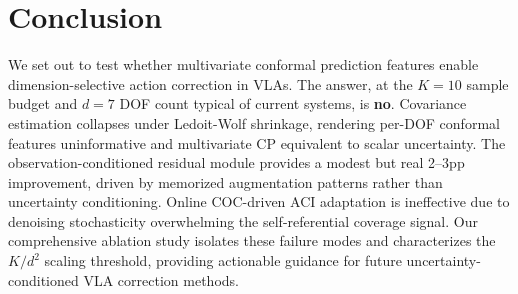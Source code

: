 \documentclass[letterpaper]{article}
\begin{document}
\section{Conclusion}

We set out to test whether multivariate conformal prediction features enable dimension-selective action correction in VLAs.
The answer, at the $K{=}10$ sample budget and $d{=}7$ DOF count typical of current systems, is \textbf{no}.
Covariance estimation collapses under Ledoit-Wolf shrinkage, rendering per-DOF conformal features uninformative and multivariate CP equivalent to scalar uncertainty.
The observation-conditioned residual module provides a modest but real 2--3pp improvement, driven by memorized augmentation patterns rather than uncertainty conditioning.
Online COC-driven ACI adaptation is ineffective due to denoising stochasticity overwhelming the self-referential coverage signal.
Our comprehensive ablation study isolates these failure modes and characterizes the $K/d^2$ scaling threshold, providing actionable guidance for future uncertainty-conditioned VLA correction methods.
\end{document}
